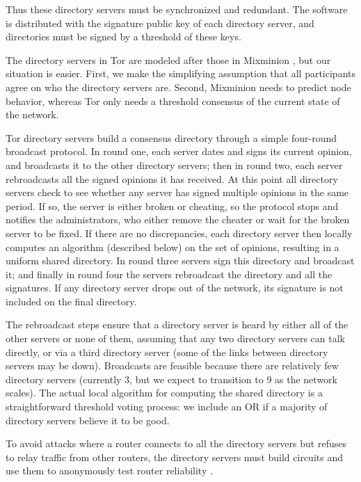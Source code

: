 \documentclass[times,10pt,twocolumn]{article}
\begin{document}
Thus these directory servers must be synchronized and redundant. The
software is distributed with the signature public key of each directory
server, and directories must be signed by a threshold of these keys.

The directory servers in Tor are modeled after those in Mixminion
\cite{minion-design}, but our situation is easier. First, we make the
simplifying assumption that all participants agree on who the
directory servers are. Second, Mixminion needs to predict node
behavior, whereas Tor only needs a threshold consensus of the current
state of the network.

Tor directory servers build a consensus directory through a simple
four-round broadcast protocol.  In round one, each server dates and
signs its current opinion, and broadcasts it to the other directory
servers; then in round two, each server rebroadcasts all the signed
opinions it has received.  At this point all directory servers check
to see whether any server has signed multiple opinions in the same
period. If so, the server is either broken or cheating, so the protocol
stops and notifies the administrators, who either remove the cheater
or wait for the broken server to be fixed.  If there are no
discrepancies, each directory server then locally computes an algorithm
(described below)
on the set of opinions, resulting in a uniform shared directory. In
round three servers sign this directory and broadcast it; and finally
in round four the servers rebroadcast the directory and all the
signatures.  If any directory server drops out of the network, its
signature is not included on the final directory.

The rebroadcast steps ensure that a directory server is heard by
either all of the other servers or none of them, assuming that any two
directory servers can talk directly, or via a third directory server (some of the
links between directory servers may be down). Broadcasts are feasible
because there are relatively few directory servers (currently 3, but we expect
to transition to 9 as the network scales). The actual local algorithm
for computing the shared directory is a straightforward threshold
voting process: we include an OR if a majority of directory servers
believe it to be good.

To avoid attacks where a router connects to all the directory servers
but refuses to relay traffic from other routers, the directory servers
must build circuits and use them to anonymously test router reliability
\cite{mix-acc}.
\end{document}
